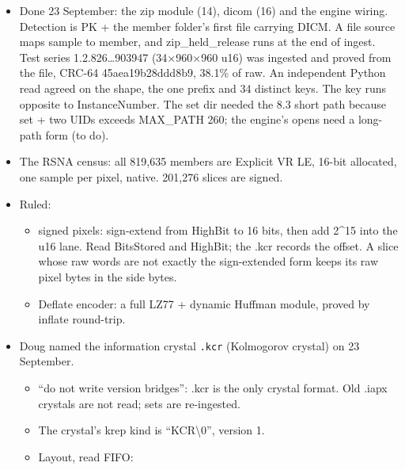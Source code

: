 \begin{itemize}
\begin{enumerate}
\item the zip module (ZIP64 walk moves out of npy.c; module 14);
\item dicom;
\item EngineSideBytes on EngineArrayRead;
\item .kcr v2;
\item one series end to end, then ping RSNA (rsna-knee-abnormality-7d). The data: \textbackslash{}server\textbackslash{}S\textbackslash{}kaggle\_\allowbreak{}project\_\allowbreak{}data\textbackslash{}rsna\_\allowbreak{}knee\textbackslash{}rsna-knee-abnormality-detection.zip (265 GB, 819,640 deflate members, train\_\allowbreak{}series|test\_\allowbreak{}series/<Study>/<Series>/<SOP>.dcm).
\end{enumerate}
\item Done 23 September: the zip module (14), dicom (16) and the engine wiring. Detection is PK + the member folder's first file carrying DICM. A file source maps sample to member, and zip\_\allowbreak{}held\_\allowbreak{}release runs at the end of ingest. Test series 1.2.826…903947 (34×960×960 u16) was ingested and proved from the file, CRC-64 45aea19b28ddd8b9, 38.1\% of raw. An independent Python read agreed on the shape, the one prefix and 34 distinct keys. The key runs opposite to InstanceNumber. The set dir needed the 8.3 short path because set + two UIDs exceeds MAX\_\allowbreak{}PATH 260; the engine's opens need a long-path form (to do).
\item The RSNA census: all 819,635 members are Explicit VR LE, 16-bit allocated, one sample per pixel, native. 201,276 slices are signed.
\item Ruled:

\begin{itemize}
\item signed pixels: sign-extend from HighBit to 16 bits, then add 2\textasciicircum{}15 into the u16 lane. Read BitsStored and HighBit; the .kcr records the offset. A slice whose raw words are not exactly the sign-extended form keeps its raw pixel bytes in the side bytes.
\item Deflate encoder: a full LZ77 + dynamic Huffman module, proved by inflate round-trip.
\end{itemize}
\item Doug named the information crystal \texttt{.\allowbreak{}kcr} (Kolmogorov crystal) on 23 September.

\begin{itemize}
\item “do not write version bridges”: .kcr is the only crystal format. Old .iapx crystals are not read; sets are re-ingested.
\item The crystal's krep kind is “KCR\textbackslash{}0”, version 1.
\item Layout, read FIFO:


\end{itemize}
\end{itemize}
